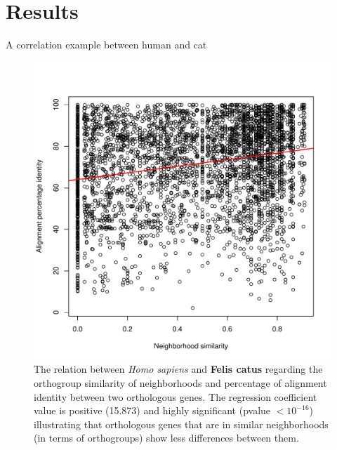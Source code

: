 \documentclass[12pt]{article}
\begin{document}
\section*{Results}

A correlation example between human and cat

\begin{figure}[htbp!]
  \centering
  \includegraphics[width=\textwidth]{correlationPlot.pdf}
  \caption{The relation between {\it Homo sapiens} and {\bf Felis
      catus} regarding the orthogroup similarity of neighborhoods and
    percentage of alignment identity between two orthologous
    genes. The regression coefficient value is positive (15.873) and
    highly significant (pvalue $<10^{-16}$) illustrating that
    orthologous genes that are in similar neighborhoods (in terms of
    orthogroups) show less differences between them.}
  \label{fig:hcexample}
\end{figure}



\end{document}
